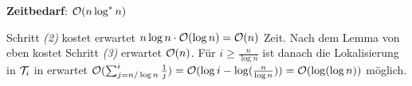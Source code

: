 \linie

\textbf{Zeitbedarf}:
$\mathcal{O}(n \log^\ast n)$

\begin{Beweis}
    Schritt \emph{(2)} kostet erwartet $n \log n \cdot \mathcal{O}(\log n) = \mathcal{O}(n)$ Zeit.
    Nach dem Lemma von eben kostet Schritt \emph{(3)} erwartet $\mathcal{O}(n)$.
    Für $i \ge \frac{n}{\log n}$ ist danach die Lokalisierung in $\mathcal{T}_i$ in erwartet
    $\mathcal{O}(\sum_{j=n/\log n}^i \frac{1}{j})
    = \mathcal{O}(\log i - \log(\frac{n}{\log n}))
    = \mathcal{O}(\log(\log n))$ möglich.
\end{Beweis}

\pagebreak
